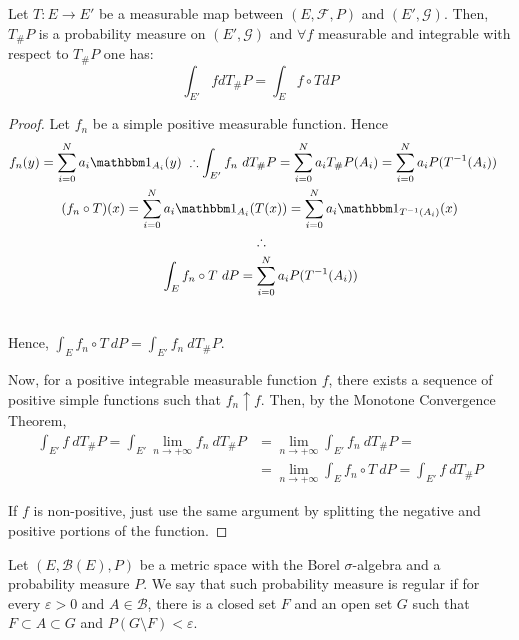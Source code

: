 \begin{theorem}
	Let $T: E \to E'$ be a measurable map between
	$(E, \mathcal F, P)$ and $(E', \mathcal G)$. Then,
	$T_\# P$ is a probability measure on $(E', \mathcal G)$ and
	$\forall f$ measurable and integrable with respect to
	$T_\#P$ one has:
	\begin{equation}
		\int_{E'} f dT_\#P = \int_E f \circ T dP
	\end{equation}
	\label{thm:pushforward}
\end{theorem}
\begin{proof}
	Let $f_n$ be a simple positive measurable function. Hence
	\begin{equation*}
		\begin{multlined}
			f_n(y) = \sum^N_{i=0} a_i \mathbbm 1_{A_i}(y) \ \therefore
			\int_{E'} f_n \ dT_\# P =
			\sum^N_{i=0} a_i T_\# P(A_i) =
			\sum^N_{i=0} a_i P(T^{-1}(A_i) )
			\\
			(f_n\circ T)(x) =
			\sum^N_{i=0} a_i \mathbbm 1_{A_i}(T(x))=
			\sum^N_{i=0} a_i \mathbbm 1_{T^{-1}(A_i)}(x)
			\\
			\therefore
			\\
			\int_E f_n \circ T \ dP =
			\sum^N_{i=0} a_i P(T^{-1}(A_i) ) \\
		\end{multlined}
	\end{equation*}

	Hence, $\int_E f_n \circ T \ dP = \int_{E'} f_n \ dT_\# P$.

	Now, for a positive integrable measurable function
	$f$, there exists a sequence
	of positive simple functions such that $f_n \uparrow f$. Then,
	by the Monotone Convergence Theorem,
	\begin{align*}
		\int_{E'} f \ dT_\# P =
		\int_{E'}\lim_{n\to +\infty}  f_n \ dT_\# P & =
		\lim_{n\to +\infty} \int_{E'} f_n \ dT_\# P =                                               \\
		                                            & =\lim_{n\to +\infty}	\int_E f_n \circ T \ dP =
		\int_{E'} f \ dT_\# P
	\end{align*}

	If $f$ is non-positive, just use the same argument by splitting
	the negative and positive portions of the function.

\end{proof}


\begin{definition}
	Let $(E,\mathcal B(E), P)$ be a metric space with the Borel $\sigma$-algebra
	and a probability measure $P$.
	We say that such probability measure is regular if
	for every $\varepsilon>0$ and $A \in \mathcal B$, there is a
	closed set $F$ and an open set $G$ such that
	$F\subset A \subset G$ and $P(G \setminus F)< \varepsilon$.
\end{definition}

